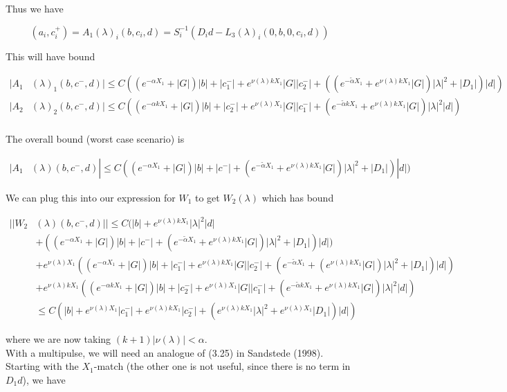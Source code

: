 \documentclass[12pt]{article}
\begin{document}
\begin{enumerate}
Thus we have

\[
(a_i, c_i^+) = A_1(\lambda)_i(b, c_i, d) = S_i^{-1}(D_i d - L_3(\lambda)_i(0, b, 0, c_i, d))
\]

This will have bound

\begin{align*}
|A_1&(\lambda)_1(b, c^-, d)| \leq C ((e^{-\alpha X_1} + |G|) |b| + |c_1^-| + e^{\nu(\lambda)k X_1} |G||c_2^-| + ((e^{-\tilde{\alpha} X_1} + e^{\nu(\lambda)k X_1} |G|) |\lambda|^2 + |D_1| )|d| ) \\
|A_2&(\lambda)_2(b, c^-, d)| \leq C ((e^{-\alpha k X_1} + |G|) |b| + |c_2^-| + e^{\nu(\lambda) X_1} |G||c_1^-| + (e^{-\tilde{\alpha} k X_1} + e^{\nu(\lambda)k X_1} |G|) |\lambda|^2 |d| ) \\
\end{align*}

The overall bound (worst case scenario) is 

\begin{align*}
|A_1&(\lambda)(b, c^-, d)| \leq C( (e^{-\alpha X_1} + |G|) |b| + |c^-| + (e^{-\tilde{\alpha} X_1} + e^{\nu(\lambda)k X_1} |G|) |\lambda|^2 + |D_1|) |d| )
\end{align*}

We can plug this into our expression for $W_1$ to get $W_2(\lambda)$ which has bound

\begin{align*}
||W_2&(\lambda)(b,c^-,d)|| \leq C (|b| + e^{\nu(\lambda)k X_1}|\lambda|^2 |d|\\
&+ ( (e^{-\alpha X_1} + |G|) |b| + |c^-| + (e^{-\tilde{\alpha} X_1} + e^{\nu(\lambda)k X_1} |G|) |\lambda|^2 + |D_1|) |d| ) \\
&+ e^{\nu(\lambda)X_1} ((e^{-\alpha X_1} + |G|) |b| + |c_1^-| + e^{\nu(\lambda)k X_1} |G||c_2^-| + (e^{-\tilde{\alpha} X_1} + (e^{\nu(\lambda)k X_1} |G|) |\lambda|^2 + |D_1|)|d| ) \\
&+ e^{\nu(\lambda)k X_1} ((e^{-\alpha k X_1} + |G|) |b| + |c_2^-| + e^{\nu(\lambda) X_1} |G||c_1^-| + (e^{-\tilde{\alpha} k X_1} + e^{\nu(\lambda)k X_1} |G|) |\lambda|^2 |d| ) \\
&\leq C( |b| + e^{\nu(\lambda) X_1} |c_1^-| +  e^{\nu(\lambda) k X_1} |c_2^-| + (e^{\nu(\lambda)k X_1}|\lambda|^2 + e^{\nu(\lambda) X_1} |D_1|) |d| )
\end{align*}

where we are now taking $(k + 1)|\nu(\lambda)| < \alpha$.\\

With a multipulse, we will need an analogue of (3.25) in Sandstede (1998). Starting with the $X_1$-match (the other one is not useful, since there is no term in $D_1 d$), we have


\end{enumerate}
\end{document}
